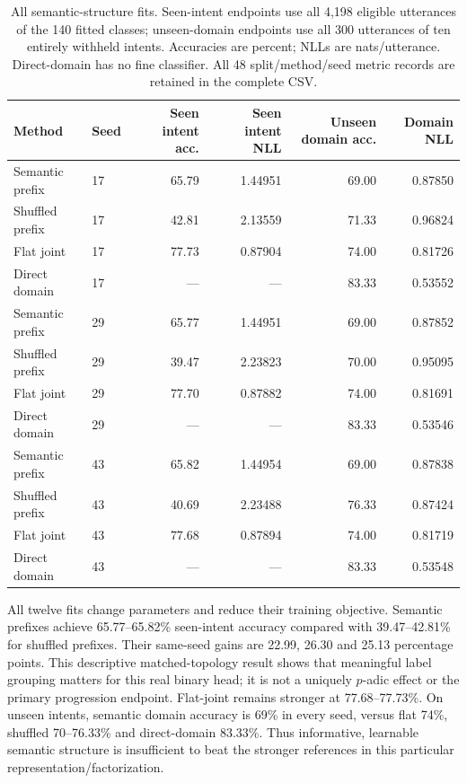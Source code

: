 \documentclass[11pt]{article}
\begin{document}
\begin{table}[htbp]
\centering\small
\caption{All semantic-structure fits. Seen-intent endpoints use all 4,198
eligible utterances of the 140 fitted classes; unseen-domain endpoints use
all 300 utterances of ten entirely withheld intents. Accuracies are percent;
NLLs are nats/utterance. Direct-domain has no fine classifier. All 48
split/method/seed metric records are retained in the complete CSV.}
\label{tab:semantic-all}
\begin{tabular}{llrrrr}
\toprule
Method & Seed & Seen intent acc. & Seen intent NLL & Unseen domain acc. & Domain NLL\\
\midrule
Semantic prefix & 17 & 65.79 & 1.44951 & 69.00 & 0.87850\\
Shuffled prefix & 17 & 42.81 & 2.13559 & 71.33 & 0.96824\\
Flat joint & 17 & 77.73 & 0.87904 & 74.00 & 0.81726\\
Direct domain & 17 & --- & --- & 83.33 & 0.53552\\
Semantic prefix & 29 & 65.77 & 1.44951 & 69.00 & 0.87852\\
Shuffled prefix & 29 & 39.47 & 2.23823 & 70.00 & 0.95095\\
Flat joint & 29 & 77.70 & 0.87882 & 74.00 & 0.81691\\
Direct domain & 29 & --- & --- & 83.33 & 0.53546\\
Semantic prefix & 43 & 65.82 & 1.44954 & 69.00 & 0.87838\\
Shuffled prefix & 43 & 40.69 & 2.23488 & 76.33 & 0.87424\\
Flat joint & 43 & 77.68 & 0.87894 & 74.00 & 0.81719\\
Direct domain & 43 & --- & --- & 83.33 & 0.53548\\
\bottomrule
\end{tabular}
\end{table}

All twelve fits change parameters and reduce their training objective.
Semantic prefixes achieve 65.77--65.82\% seen-intent accuracy compared with
39.47--42.81\% for shuffled prefixes. Their same-seed gains are 22.99,
26.30 and 25.13 percentage points. This descriptive matched-topology result
shows that meaningful label grouping matters for this real binary head;
it is not a uniquely \(p\)-adic effect or the primary progression endpoint.
Flat-joint remains stronger at 77.68--77.73\%.
On unseen intents, semantic domain accuracy is 69\% in every seed,
versus flat 74\%, shuffled 70--76.33\% and direct-domain 83.33\%.
Thus informative, learnable semantic structure is insufficient to beat the
stronger references in this particular representation/factorization.
\end{document}
